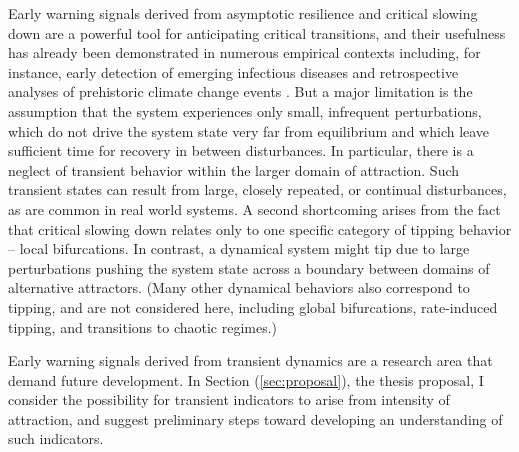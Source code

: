 Early warning signals derived from asymptotic resilience and critical slowing down are a powerful tool for anticipating critical transitions, and their usefulness has already been demonstrated in numerous empirical contexts including, for instance, early detection of emerging infectious diseases \cite{brettDynamicalFootprintsEnable2020} and retrospective analyses of prehistoric climate change events \cite{dakosSlowingEarlyWarning2008a}. But a major limitation is the assumption that the system experiences only small, infrequent perturbations, which do not drive the system state very far from equilibrium and which leave sufficient time for recovery in between disturbances. In particular, there is a neglect of transient behavior within the larger domain of attraction. Such transient states can result from large, closely repeated, or continual disturbances, as are common in real world systems. A second shortcoming arises from the fact that critical slowing down relates only to one specific category of tipping behavior -- local bifurcations. In contrast, a dynamical system might tip due to large perturbations pushing the system state across a boundary between domains of alternative attractors. (Many other dynamical behaviors also correspond to tipping, and are not considered here, including global bifurcations, rate-induced tipping, and transitions to chaotic regimes.)


Early warning signals derived from transient dynamics are a research area that demand future development. In Section (\ref{sec:proposal}), the thesis proposal, I consider the possibility for transient indicators to arise from intensity of attraction, and suggest preliminary steps toward developing an understanding of such indicators. %








